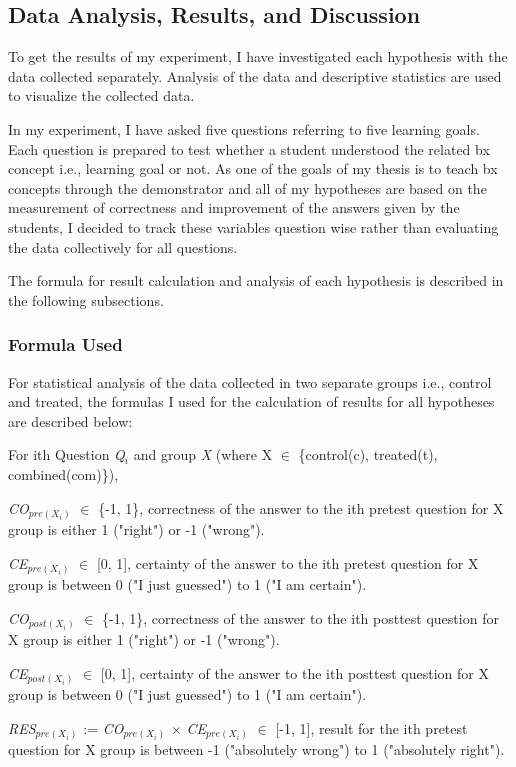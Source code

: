 \subsection{Data Analysis, Results, and Discussion}\label{subsec:results}
To get the results of my experiment, I have investigated each hypothesis with the data collected separately. Analysis of the data and descriptive statistics are used to visualize the collected data. 

In my experiment, I have asked five questions referring to five learning goals. Each question is prepared to test whether a student understood the related bx concept i.e., learning goal or not. As one of the goals of my thesis is to teach bx concepts through the demonstrator and all of my hypotheses are based on the measurement of correctness and improvement of the answers given by the students, I decided to track these variables question wise rather than evaluating the data collectively for all questions.

The formula for result calculation and analysis of each hypothesis is described in the following subsections.

\subsubsection{Formula Used}\label{subsubsec:evaluation_formula}
For statistical analysis of the data collected in two separate groups i.e., control and treated, the formulas I used for the calculation of results for all hypotheses are described below:

For ith Question \textit{Q$_{i}$} and group \textit{X} (where X $\in$ \{control(c), treated(t), combined(com)\}),

\textit{CO$_{pre(X_i)}$} $\in$ \{-1, 1\}, correctness of the answer to the ith pretest question for X group is either 1 ("right") or -1 ("wrong").

\textit{CE$_{pre(X_i)}$} $\in$ [0, 1], certainty of the answer to the ith pretest question for X group is between 0 ("I just guessed") to 1 ("I am certain").

\textit{CO$_{post(X_i)}$} $\in$ \{-1, 1\}, correctness of the answer to the ith posttest question for X group is either 1 ("right") or -1  ("wrong").

\textit{CE$_{post(X_i)}$} $\in$ [0, 1], certainty of the answer to the ith posttest question for X group is between 0 ("I just guessed") to 1 ("I am certain").

\textit{RES$_{pre(X_i)}$} := \textit{CO$_{pre(X_i)}$} $\times$ \textit{CE$_{pre(X_i)}$} $\in$ [-1,  1], result for the ith pretest question for X group is between -1 ("absolutely wrong") to 1 ("absolutely right").

